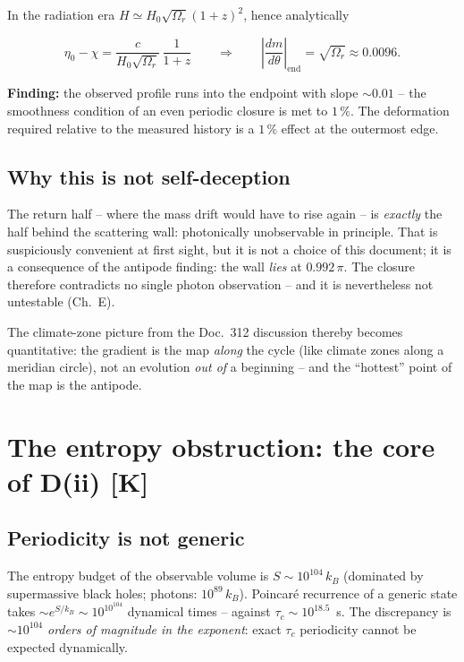 \documentclass[11pt]{report}
\begin{document}
In the radiation era $H \simeq H_0\sqrt{\Omega_r}(1{+}z)^2$, hence
analytically

\[
  \eta_0 - \chi = \frac{c}{H_0\sqrt{\Omega_r}}\,\frac{1}{1{+}z}
  \qquad\Longrightarrow\qquad
  \left|\frac{dm}{d\theta}\right|_{\text{end}}
  = \sqrt{\Omega_r} \approx 0.0096.
\]

\textbf{Finding:} the observed profile runs into the endpoint with
slope $\sim 0.01$ -- the smoothness condition of an even periodic
closure is met to $1\,\%$. The deformation required relative to
the measured history is a $1\,\%$ effect at the outermost edge.

\section{Why this is not self-deception}

The return half -- where the mass drift would have to rise again
-- is \emph{exactly} the half behind the scattering wall:
photonically unobservable in principle. That is suspiciously
convenient at first sight, but it is not a choice of this
document; it is a consequence of the antipode finding: the wall
\emph{lies} at $0.992\,\pi$. The closure therefore contradicts no
single photon observation -- and it is nevertheless not untestable
(Ch.~E).

The climate-zone picture from the Doc.~312 discussion thereby
becomes quantitative: the gradient is the map \emph{along} the
cycle (like climate zones along a meridian circle), not an
evolution \emph{out of} a beginning -- and the \enquote{hottest}
point of the map is the antipode.

\chapter{The entropy obstruction: the core of D(ii) [K]}

\section{Periodicity is not generic}

The entropy budget of the observable volume is
$S \sim 10^{104}\,k_B$ (dominated by supermassive black holes;
photons: $10^{89}\,k_B$). Poincaré recurrence of a generic state
takes $\sim e^{S/k_B} \sim 10^{10^{104}}$ dynamical times --
against $\tau_c \sim 10^{18.5}$~s. The discrepancy is
$\sim 10^{104}$ \emph{orders of magnitude in the exponent}: exact
$\tau_c$ periodicity cannot be expected dynamically.
\end{document}
